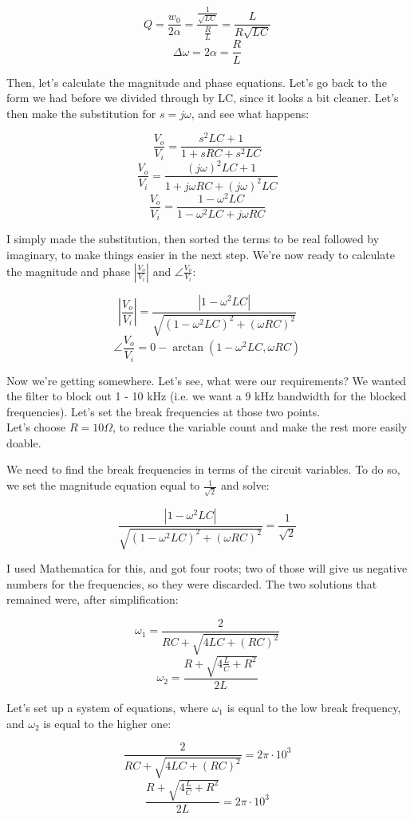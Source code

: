 \documentclass[12pt,a4paper]{report}
\begin{document}
\[ Q = \frac{w_0}{2\alpha} = \frac{ \frac{1}{\sqrt{LC}} }{ \frac{R}{L} } = \frac{L}{R\sqrt{LC}} \]
\[ \Delta\omega = 2 \alpha = \frac{R}{L} \]

Then, let's calculate the magnitude and phase equations. Let's go back to the form we had before we divided through by LC, since it looks a bit cleaner. Let's then make the substitution for $s = j\omega$, and see what happens:

\[ \frac{V_o}{V_i} = \frac{s^2LC + 1}{1 + sRC + s^2LC} \]
\[ \frac{V_o}{V_i} = \frac{(j\omega)^2 LC + 1}{1 + j\omega RC + (j\omega )^2 LC} \]
\[ \frac{V_o}{V_i} = \frac{1 - \omega^2 LC}{1 - \omega^2 LC + j\omega RC} \]

I simply made the substitution, then sorted the terms to be real followed by imaginary, to make things easier in the next step. We're now ready to calculate the magnitude and phase $\displaystyle \left| \frac{V_o}{V_i} \right|$ and $\displaystyle \angle \frac{V_o}{V_i}$:

\[ \displaystyle \left| \frac{V_o}{V_i} \right| = \frac{|1 - \omega^2 L C|}{\sqrt{(1 - \omega^2 LC)^2 + (\omega RC)^2}} \]
\[ \displaystyle \angle \frac{V_o}{V_i} = 0 - \arctan{(1 - \omega^2 LC, \omega RC)} \]

Now we're getting somewhere. Let's see, what were our requirements? We wanted the filter to block out 1 - 10 kHz (i.e. we want a 9 kHz bandwidth for the blocked frequencies). Let's set the break frequencies at those two points.\\
Let's choose $R = 10 \Omega$, to reduce the variable count and make the rest more easily doable.

We need to find the break frequencies in terms of the circuit variables. To do so, we set the magnitude equation equal to $\displaystyle \frac{1}{\sqrt{2}}$ and solve:

\[ \frac{|1 - \omega^2 L C|}{\sqrt{(1 - \omega^2 LC)^2 + (\omega RC)^2}} = \frac{1}{\sqrt{2}} \]

I used Mathematica for this, and got four roots; two of those will give us negative numbers for the frequencies, so they were discarded. The two solutions that remained were, after simplification:

\[ \omega_1 = \frac{2}{RC + \sqrt{4LC + (RC)^2}} \]
\[ \omega_2 = \frac{R + \sqrt{4\frac{L}{C} + R^2}}{2L} \]

Let's set up a system of equations, where $\omega_1$ is equal to the low break frequency, and $\omega_2$ is equal to the higher one:

\[ \frac{2}{RC + \sqrt{4LC + (RC)^2}} = 2\pi \cdot 10^3 \]
\[ \frac{R + \sqrt{4\frac{L}{C} + R^2}}{2L} = 2\pi \cdot 10^3 \]
\end{document}
